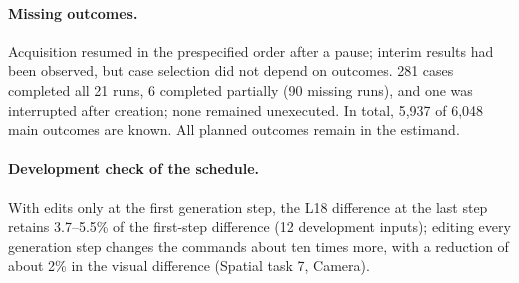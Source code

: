 \paragraph{Missing outcomes.}
Acquisition resumed in the prespecified order after a pause; interim results had been observed, but case selection did not depend on outcomes. 281 cases completed all 21 runs, 6 completed partially (90 missing runs), and one was interrupted after creation; none remained unexecuted. In total, 5,937 of 6{,}048 main outcomes are known. All planned outcomes remain in the estimand.

\paragraph{Development check of the schedule.}
With edits only at the first generation step, the L18 difference at the last step retains 3.7--5.5\% of the first-step difference (12 development inputs); editing every generation step changes the commands about ten times more, with a reduction of about 2\% in the visual difference (Spatial task 7, Camera).
